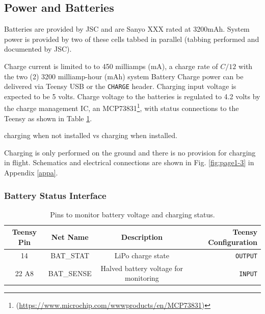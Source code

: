 \documentclass{article}
\begin{document}



\subsection{Power and Batteries}
Batteries are provided by JSC and are Sanyo XXX rated at 3200mAh. System power is provided by two of these cells tabbed in parallel (tabbing performed and documented by JSC).

Charge current is limited to to 450 milliamps (mA), a charge rate of $C/12$ with the two (2) 3200 milliamp-hour (mAh) system  Battery Charge power can be delivered via Teensy USB or the \texttt{CHARGE} header. Charging input voltage is expected to be 5 volts. Charge voltage to the batteries is regulated to 4.2 volts by the charge management IC, an MCP73831\footnote{ (\url{https://www.microchip.com/wwwproducts/en/MCP73831})}, with status connections to the Teensy as shown in Table \ref{tab:pins-battery}. 

charging when not installed vs charging when installed.

Charging is only performed on the ground and there is no provision for charging in flight. Schematics and electrical connections are shown in Fig. \ref{fig:page1-3} in Appendix \ref{appa}.

\subsubsection{Battery Status Interface}
\begin{table}[H]
    \centering
    \caption{Pins to monitor battery voltage and charging status.}
	\label{tab:pins-battery}
    \begin{tabular}{c|c|c|r}
    Teensy Pin & Net Name  & Description   & Teensy Configuration \\
    \hline 
    14 & BAT\_STAT & LiPo charge state & \texttt{OUTPUT} \\
    22 A8 & BAT\_SENSE    &  Halved battery voltage for monitoring &   \texttt{INPUT} 
    \end{tabular}
\end{table}
\end{document}

